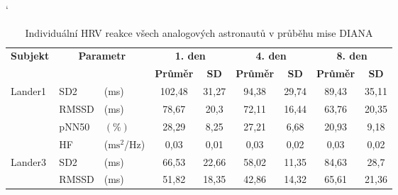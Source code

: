 \begin{table}[!htb]
    \catcode`
    \footnotesize
    \centering
    \caption{Individuální HRV reakce všech analogových astronautů v průběhu mise DIANA}
    \begin{threeparttable}
        \begin{tabular*}{\linewidth}{@{\extracolsep{\fill}} lllcccccc @{}}
            \toprule
            \textbf{Subjekt}                & \multicolumn{2}{c}{\textbf{Parametr}} & \multicolumn{2}{c}{\textbf{1. den}} & \multicolumn{2}{c}{\textbf{4. den}} & \multicolumn{2}{c}{\textbf{8. den}}                                                                 \\ \cmidrule(rl){4-5} \cmidrule(rl){6-7} \cmidrule(rl){8-9}
            &                                       &                                     & \textbf{Průměr}                     & \textbf{SD}                         & \textbf{Průměr} & \textbf{SD} & \textbf{Průměr} & \textbf{SD} \\ \midrule
            \multirow[t]{4}{*}{Lander1}     & SD2                                  & (ms)                                & 102,48                              & 31,27                               & 94,38           & 29,74       & 89,43           & 35,11       \\
            & RMSSD                                 & (ms)                                & 78,67                               & 20,3                                & 72,11           & 16,44       & 63,76           & 20,35       \\
            & pNN50                                 & $(\%)$                              & 28,29                               & 8,25                                & 27,21           & 6,68        & 20,93           & 9,18        \\
            & HF                                    & ($\text{ms}^2$/Hz)                  & 0,03                                & 0,01                                & 0,03            & 0,02        & 0,03            & 0,02        \\ \midrule
            \multirow[t]{4}{*}{Lander3}     & SD2                                  & (ms)                                & 66,53                               & 22,66                               & 58,02           & 11,35       & 84,63           & 28,7        \\
            & RMSSD                                 & (ms)                                & 51,82                               & 18,35                               & 42,86           & 14,32       & 65,61           & 21,36       \\

\end{tabular*}
\end{threeparttable}
\end{table}
